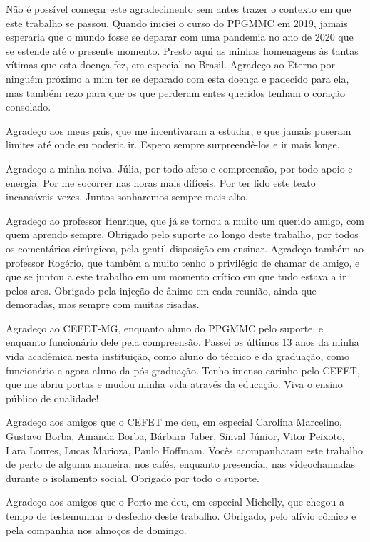 \begin{agradecimentos}
Não é possível começar este agradecimento sem antes trazer o contexto em que este trabalho se passou. Quando iniciei o curso do PPGMMC em 2019, jamais esperaria que o mundo fosse se deparar com uma pandemia no ano de 2020 que se estende até o presente momento. Presto aqui as minhas homenagens às tantas vítimas que esta doença fez, em especial no Brasil. Agradeço ao Eterno por ninguém próximo a mim ter se deparado com esta doença e padecido para ela, mas também rezo para que os que perderam entes queridos tenham o coração consolado.

Agradeço aos meus pais, que me incentivaram a estudar, e que jamais puseram limites até onde eu poderia ir. Espero sempre surpreendê-los e ir mais longe. 

Agradeço a minha noiva, Júlia, por todo afeto e compreensão, por todo apoio e energia. Por me socorrer nas horas mais difíceis. Por ter lido este texto incansáveis vezes. Juntos sonharemos sempre mais alto. 

Agradeço ao professor Henrique, que já se tornou a muito um querido amigo, com quem aprendo sempre. Obrigado pelo suporte ao longo deste trabalho, por todos os comentários cirúrgicos, pela gentil disposição em ensinar. Agradeço também ao professor Rogério, que também a muito tenho o privilégio de chamar de amigo, e que se juntou a este trabalho em um momento crítico em que tudo estava a ir pelos ares. Obrigado pela injeção de ânimo em cada reunião, ainda que demoradas, mas sempre com muitas risadas. 

Agradeço ao CEFET-MG, enquanto aluno do PPGMMC pelo suporte, e enquanto funcionário dele pela compreensão. Passei os últimos 13 anos da minha vida acadêmica nesta instituição, como aluno do técnico e da graduação, como funcionário e agora aluno da pós-graduação. Tenho imenso carinho pelo CEFET, que me abriu portas e mudou minha vida através da educação. Viva o ensino público de qualidade!

Agradeço aos amigos que o CEFET me deu, em especial Carolina Marcelino,  Gustavo Borba, Amanda Borba, Bárbara Jaber, Sinval Júnior, Vitor Peixoto, Lara Loures, Lucas Marioza, Paulo Hoffmam. Vocês acompanharam este trabalho de perto de alguma maneira, nos cafés, enquanto presencial, nas videochamadas durante o isolamento social. Obrigado por todo o suporte. 

Agradeço aos amigos que o Porto me deu, em especial Michelly, que chegou a tempo de testemunhar o desfecho deste trabalho. Obrigado, pelo alívio cômico e pela companhia nos almoços de domingo.

\end{agradecimentos}